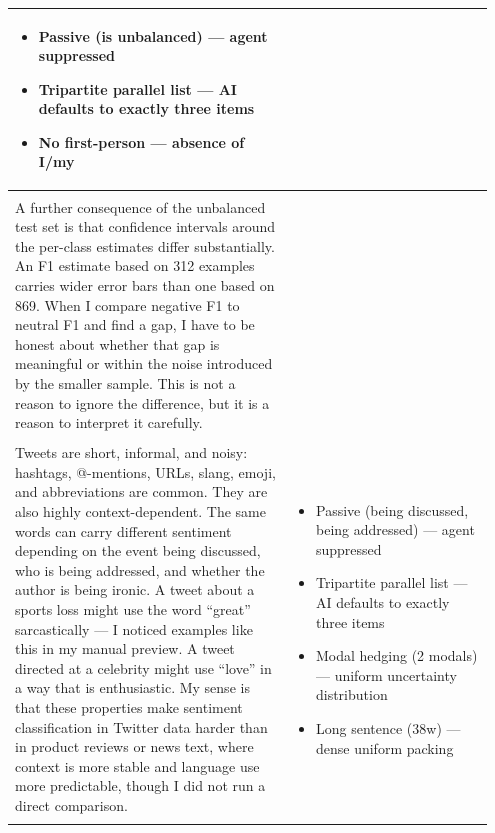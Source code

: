 \documentclass[11pt]{article}
\begin{document}
\begin{longtable}{|p{0.55\linewidth}|p{0.40\linewidth}|}
\begin{itemize}[leftmargin=1em,itemsep=1pt,topsep=1pt,parsep=0pt]
  \item Passive (is unbalanced) --- agent suppressed
  \item Tripartite parallel list --- AI defaults to exactly three items
  \item No first-person --- absence of I/my
\end{itemize} \\[2pt]
\hline
\rule{0pt}{3.5cm} & \\
\hline
A further consequence of the unbalanced test set is that confidence intervals around the per-class estimates differ substantially. An F1 estimate based on 312 examples carries wider error bars than one based on 869. When I compare negative F1 to neutral F1 and find a gap, I have to be honest about whether that gap is meaningful or within the noise introduced by the smaller sample. This is not a reason to ignore the difference, but it is a reason to interpret it carefully. &  \\[2pt]
\hline
\rule{0pt}{3.5cm} & \\
\hline
Tweets are short, informal, and noisy: hashtags, @-mentions, URLs, slang, emoji, and abbreviations are common. They are also highly context-dependent. The same words can carry different sentiment depending on the event being discussed, who is being addressed, and whether the author is being ironic. A tweet about a sports loss might use the word ``great'' sarcastically --- I noticed examples like this in my manual preview. A tweet directed at a celebrity might use ``love'' in a way that is enthusiastic. My sense is that these properties make sentiment classification in Twitter data harder than in product reviews or news text, where context is more stable and language use more predictable, though I did not run a direct comparison. & \begin{itemize}[leftmargin=1em,itemsep=1pt,topsep=1pt,parsep=0pt]
  \item Passive (being discussed, being addressed) --- agent suppressed
  \item Tripartite parallel list --- AI defaults to exactly three items
  \item Modal hedging (2 modals) --- uniform uncertainty distribution
  \item Long sentence (38w) --- dense uniform packing
\end{itemize} \\[2pt]
\hline
\rule{0pt}{3.5cm} & \\
\hline

\end{longtable}
\end{document}
